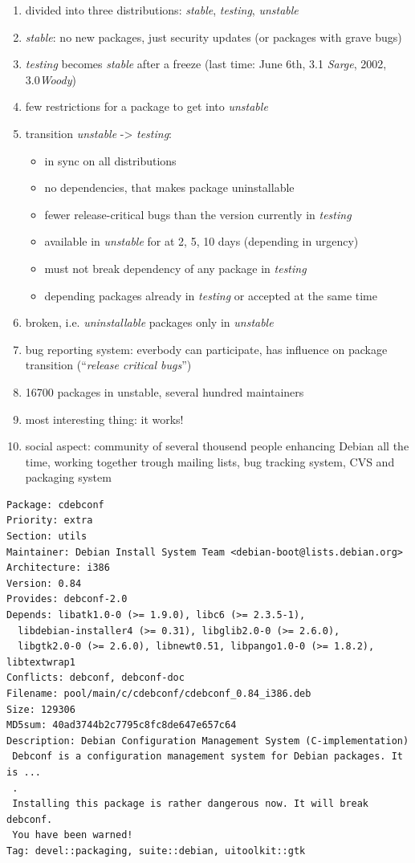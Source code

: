 \documentclass[a4paper,landscape]{foils}
\newcommand\slide[1]{\foilhead[-1cm]{#1}}
\begin{document}
\begin{enumerate}
\item divided into three distributions: \emph{stable}, \emph{testing}, \emph{unstable}
\item \emph{stable}: no new packages, just security updates (or packages with grave bugs)
\item \emph{testing} becomes \emph{stable} after a freeze (last time: June 6th, 3.1 \emph{Sarge}, 2002, 3.0\emph{Woody})
\item few restrictions for a package to get into \emph{unstable}
\item transition \emph{unstable} -> \emph{testing}: 
\begin{itemize}
\item in sync on all distributions
\item no dependencies, that makes package uninstallable
\item fewer release-critical bugs than the version currently in \emph{testing}
\item available in \emph{unstable} for at 2, 5, 10 days (depending in urgency)
\item must not break dependency of any package in \emph{testing}
\item depending packages already in \emph{testing} or accepted at the same time
\end{itemize}
\item broken, i.e. \emph{uninstallable} packages only in \emph{unstable}
\item bug reporting system: everbody can participate, has influence on package transition (``\emph{release critical bugs}'')
\item 16700 packages in unstable, several hundred maintainers
\item most interesting thing: it works!
\item social aspect: community of several thousend people enhancing Debian all the time, working together
trough mailing lists, bug tracking system, CVS and packaging system
\end{enumerate}

\slide{Package Metadata}

{\small \begin{verbatim}
Package: cdebconf
Priority: extra
Section: utils
Maintainer: Debian Install System Team <debian-boot@lists.debian.org>
Architecture: i386
Version: 0.84
Provides: debconf-2.0
Depends: libatk1.0-0 (>= 1.9.0), libc6 (>= 2.3.5-1), 
  libdebian-installer4 (>= 0.31), libglib2.0-0 (>= 2.6.0), 
  libgtk2.0-0 (>= 2.6.0), libnewt0.51, libpango1.0-0 (>= 1.8.2), libtextwrap1
Conflicts: debconf, debconf-doc
Filename: pool/main/c/cdebconf/cdebconf_0.84_i386.deb
Size: 129306
MD5sum: 40ad3744b2c7795c8fc8de647e657c64
Description: Debian Configuration Management System (C-implementation)
 Debconf is a configuration management system for Debian packages. It is ...
 .
 Installing this package is rather dangerous now. It will break debconf.
 You have been warned!
Tag: devel::packaging, suite::debian, uitoolkit::gtk
\end{verbatim}}
\end{document}
